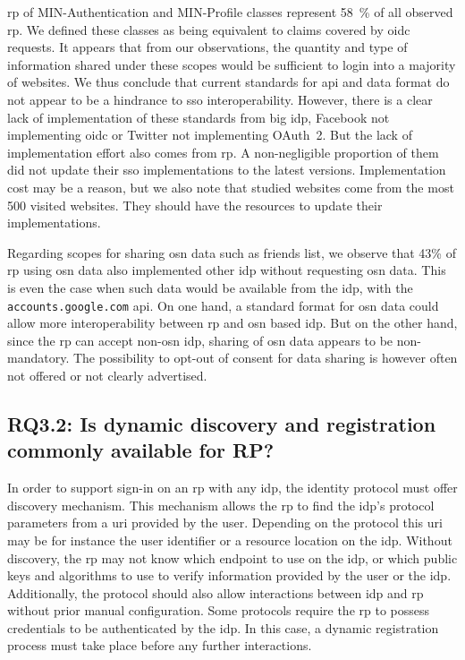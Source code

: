 \gls{rp} of MIN-Authentication and MIN-Profile classes represent \SI{58}{\percent} of all observed \gls{rp}. 
We defined these classes as being equivalent to claims covered by \gls{oidc} requests.
It appears that from our observations, the quantity and type of information shared under these scopes would be sufficient to login into a majority of websites.
We thus conclude that current standards for \gls{api} and data format do not appear to be a hindrance to \gls{sso} interoperability.
However, there is a clear lack of implementation of these standards from big \gls{idp}, \eg Facebook not implementing \gls{oidc} or Twitter not implementing OAuth~2.
But the lack of implementation effort also comes from \gls{rp}.
A non-negligible proportion of them did not update their \gls{sso} implementations to the latest versions.
Implementation cost may be a reason, but we also note that studied websites come from the most 500 visited websites.
They should have the resources to update their implementations.

Regarding scopes for sharing \gls{osn} data such as friends list, we observe that 43\% of \gls{rp} using \gls{osn} data also implemented other \gls{idp} without requesting \gls{osn} data.
This is even the case when such data would be available from the \gls{idp}, \eg with the \texttt{accounts.google.com} \gls{api}.
On one hand, a standard format for \gls{osn} data could allow more interoperability between \gls{rp} and \gls{osn} based \gls{idp}.
But on the other hand, since the \gls{rp} can accept non-\gls{osn} \gls{idp}, sharing of \gls{osn} data appears to be non-mandatory.
The possibility to opt-out of consent for data sharing is however often not offered or not clearly advertised.

\subsection{RQ3.2: Is dynamic discovery and registration commonly available for RP?}
\label{userschooseidp:h2}
In order to support sign-in on an \gls{rp} with any \gls{idp}, the identity protocol must offer discovery mechanism. 
This mechanism allows the \gls{rp} to find the \gls{idp}'s protocol parameters from a \gls{uri} provided by the user. 
Depending on the protocol this \gls{uri} may be for instance the user identifier or a resource location on the \gls{idp}. 
Without discovery, the \gls{rp} may not know which endpoint to use on the \gls{idp}, or which public keys and algorithms to use to verify information provided by the user or the \gls{idp}.
Additionally, the protocol should also allow interactions between \gls{idp} and \gls{rp} without prior manual configuration.
Some protocols require the \gls{rp} to possess credentials to be authenticated by the \gls{idp}.
In this case, a dynamic registration process must take place before any further interactions.

